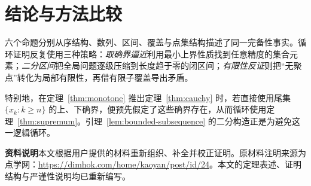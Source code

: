 \documentclass[UTF8,12pt,a4paper,fontset=fandol]{ctexart}
\begin{document}
\section{结论与方法比较}

六个命题分别从序结构、数列、区间、覆盖与点集结构描述了同一完备性事实。循环证明反复使用三种策略：\emph{取确界逼近}利用最小上界性质找到任意精度的集合元素；\emph{二分区间}把全局问题逐级压缩到长度趋于零的闭区间；\emph{有限性反证}则把“无聚点”转化为局部有限性，再借有限子覆盖导出矛盾。

特别地，在定理~\ref{thm:monotone} 推出定理~\ref{thm:cauchy} 时，若直接使用尾集 $\{x_k:k\geq n\}$ 的上、下确界，便预先假定了这些确界存在，从而循环使用定理~\ref{thm:supremum}。引理~\ref{lem:bounded-subsequence} 的二分构造正是为避免这一逻辑循环。

\noindent\textbf{资料说明}\quad 本文根据用户提供的材料重新组织、补全并校正证明。原材料注明来源为点学网：\url{https://dimhok.com/home/kaoyan/post/id/24}。本文的定理表述、证明结构与严谨性说明均已重新编写。
\end{document}
